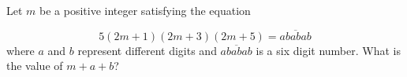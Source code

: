 Let $m$ be a positive integer satisfying the equation

\[
5(2m + 1)(2m + 3)(2m + 5) = \overline{ababab}
\]where $a$ and $b$ represent different digits and $\overline{ababab}$ is a six digit number. What is the value of $m + a + b$?
